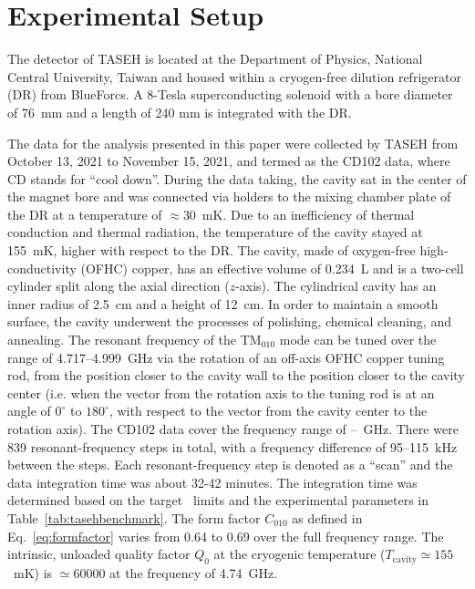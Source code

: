 
\section{Experimental Setup}\label{sec:taseh} 
The detector of TASEH is located at the Department of Physics, National 
Central University, Taiwan and housed within a cryogen-free dilution 
refrigerator (DR) from BlueForcs. A 8-Tesla superconducting solenoid with a 
bore diameter of 76~mm and a length of 240 mm is integrated with the DR. 

The data for the analysis presented in this paper were collected by TASEH 
from October 13, 2021 to November 15, 2021, and termed as the CD102 data, 
where CD stands for ``cool down''. 
During the data taking, the cavity sat in the center of the magnet bore 
and was connected via holders 
to the mixing chamber plate of the DR at a temperature of $\approx$30~mK. 
Due to an inefficiency of thermal conduction and thermal radiation, 
the temperature of the cavity stayed at 155~mK, higher with respect to the DR.
The cavity, made of oxygen-free high-conductivity (OFHC) copper, has an 
effective volume of 0.234~L and is a two-cell cylinder split along 
the axial direction ($z$-axis). 
The cylindrical cavity has an inner radius of 2.5~cm and a 
height of 12~cm.  In order to maintain a smooth surface, the cavity underwent 
the processes of polishing, chemical cleaning, and annealing. The resonant 
frequency of the TM$_{010}$ mode can be tuned over the range of 
4.717--4.999~GHz via the rotation of an off-axis OFHC copper tuning rod, from 
the position closer to the cavity wall to the position closer to the cavity 
center (i.e. when the vector from the rotation axis to the tuning rod is 
at an angle of $0^\circ$ to $180^\circ$, with respect to the vector from the 
cavity center to the rotation axis). 
The CD102 data cover the frequency range of \flo--\fhi~GHz. 
There were 839 resonant-frequency steps in total, with a frequency difference 
of 95--115~kHz between the steps. Each resonant-frequency step is denoted as 
a ``scan'' 
and the data integration time was about 32-42 minutes. The integration 
time was determined based on the target \gagg\ limits and the experimental 
parameters in Table~\ref{tab:tasehbenchmark}. The form factor $C_{010}$ as 
defined in Eq.~\eqref{eq:formfactor} varies from 0.64 to 0.69 over the 
full frequency range.  
The intrinsic, unloaded quality factor $Q_0$ at the cryogenic temperature 
($T_\mathrm{cavity}\simeq 155$~mK) is $\simeq 60000$ at the frequency of 
4.74~GHz.

